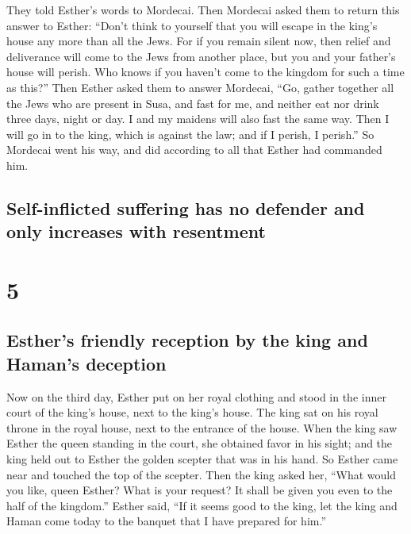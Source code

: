  They told Esther's words to Mordecai. 
Then Mordecai asked them to return this answer to Esther: ``Don't think
to yourself that you will escape in the king's house any more than all
the Jews.  For if you remain silent now, then relief and
deliverance will come to the Jews from another place, but you and your
father's house will perish. Who knows if you haven't come to the kingdom
for such a time as this?''  Then Esther asked them to
answer Mordecai,  ``Go, gather together all the Jews who
are present in Susa, and fast for me, and neither eat nor drink three
days, night or day. I and my maidens will also fast the same way. Then I
will go in to the king, which is against the law; and if I perish, I
perish.''  So Mordecai went his way, and did according to
all that Esther had commanded him.

\hypertarget{self-inflicted-suffering-has-no-defender-and-only-increases-with-resentment}{%
\subsection{Self-inflicted suffering has no defender and only increases
with
resentment}\label{self-inflicted-suffering-has-no-defender-and-only-increases-with-resentment}}

\hypertarget{section-4}{%
\section{5}\label{section-4}}

\hypertarget{esthers-friendly-reception-by-the-king-and-hamans-deception}{%
\subsection{Esther's friendly reception by the king and Haman's
deception}\label{esthers-friendly-reception-by-the-king-and-hamans-deception}}

 Now on the third day, Esther put on her royal clothing
and stood in the inner court of the king's house, next to the king's
house. The king sat on his royal throne in the royal house, next to the
entrance of the house.  When the king saw Esther the queen
standing in the court, she obtained favor in his sight; and the king
held out to Esther the golden scepter that was in his hand. So Esther
came near and touched the top of the scepter.  Then the
king asked her, ``What would you like, queen Esther? What is your
request? It shall be given you even to the half of the kingdom.''
 Esther said, ``If it seems good to the king, let the king
and Haman come today to the banquet that I have prepared for him.''

